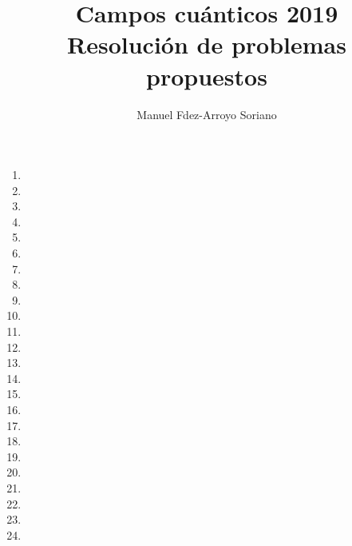
\title{Campos cuánticos 2019
\protect\\ Resolución de problemas propuestos}

\author{
  Manuel Fdez-Arroyo Soriano
}

\maketitle
\begin{enumerate}
    \item \newpage
    \item \newpage
    \item \newpage
    \item \newpage
    \item \newpage
    \item \newpage
    \item \newpage
    \item \newpage
    \item \newpage
    \item \newpage
    \item \newpage
    \item \newpage
    \item \newpage
    \item \newpage
    \item \newpage
    \item \newpage
    \item \newpage
    \item \newpage
    \item \newpage
    \item \newpage
    \item \newpage
    \item \newpage
    \item \newpage
    \item 
\end{enumerate}


